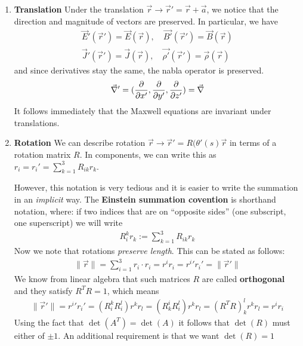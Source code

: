 \begin{enumerate}
  \item \textbf{Translation}
Under the translation $\vec{r} \to  \vec{r}' = \vec{r} + \vec{a}$, we notice that the direction and magnitude of vectors are preserved. In particular, we have
\begin{align*}
  \vec{E}'(\vec{r}') = \vec{E}(\vec{r}), \quad \vec{B'}(\vec{r}') = \vec{B}(\vec{r})\\
  \vec{J}'(\vec{r}') = \vec{J}(\vec{r}), \quad \vec{\rho'}(\vec{r}') = \vec{\rho}(\vec{r})
\end{align*}
and since derivatives stay the same, the nabla operator is preserved.
\begin{align*}
  \vec{\nabla}' = (\frac{\partial }{\partial x'}, \frac{\partial }{\partial y'},\frac{\partial }{\partial z'}) = \vec{\nabla}
\end{align*}
It follows immediately that the Maxwell equations are invariant under translations.
  \item \textbf{Rotation} We can describe rotation $\vec{r} \to  \vec{r}' = R(\theta'(s) \vec{r}$ in terms of a rotation matrix $R$.
    In components, we can write this as $r_i = r_i' = \sum_{k=1}^{3} R_{ik}r_k$.

    However, this notation is very tedious and it is easier to write the summation in an \emph{implicit} way.
    The \textbf{Einstein summation covention} is shorthand notation, where: if two indices that are on ``opposite sides'' (one subscript, one superscript) we will write
    \begin{align*}
      R_{i}^{k}r_k := \sum_{k=1}^{3}R_{ik}r_k 
    \end{align*}
    Now we note that rotations \emph{preserve length}. This can be stated as follows:
    \begin{align*}
      \|\vec{r}\| = \sum_{i=1}^{3}r_i \cdot r_i = r^{i}r_i = {r^{i}}'r_i' = \|\vec{r}'\|
    \end{align*}
    We know from linear algebra that such matrices $R$ are called \textbf{orthogonal} and they satisfy $R^{T}R = 1$, which means
    \begin{align*}
      \|\vec{r}'\| = {r^{i}}'r_i' = (R_i^{k}R_{i}^{l})r^{k}r_l = (R_k^{i}R_{i}^{l})r^{k}r_l = (R^{T}R)_k^{l}r^{k}r_l = r^{i}r_i
    \end{align*}
    Using the fact that $\det(A^T) = \det(A)$ it follows that $\det(R)$ must either of $\pm 1$.
    An additional requirement is that we want $\det(R) = 1$

\end{enumerate}

